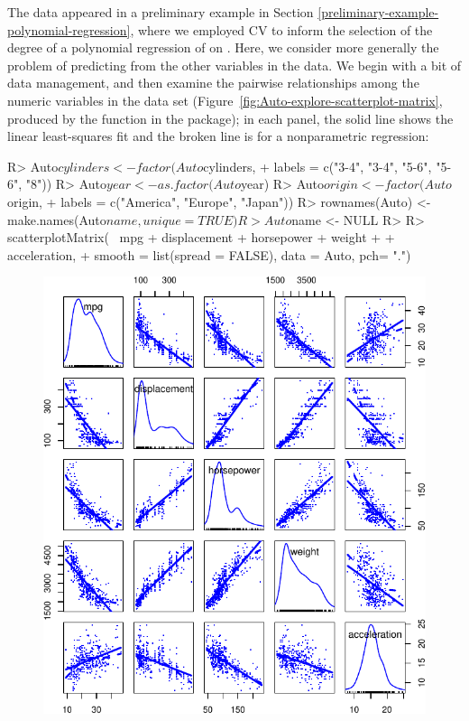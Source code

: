 \documentclass[
]{jss}
\begin{document}
The  data appeared in a preliminary example in Section
\ref{preliminary-example-polynomial-regression}, where we employed CV to
inform the selection of the degree of a polynomial regression of
 on . Here, we consider more generally the
problem of predicting  from the other variables in the
 data. We begin with a bit of data management, and then
examine the pairwise relationships among the numeric variables in the
data set (Figure~\ref{fig:Auto-explore-scatterplot-matrix}, produced by
the  function in the  package); in
each panel, the solid line shows the linear least-squares fit and the
broken line is for a nonparametric regression:

\begin{CodeChunk}
\begin{CodeInput}
R> Auto$cylinders <- factor(Auto$cylinders,
+                          labels = c("3-4", "3-4", "5-6", "5-6", "8"))
R> Auto$year <- as.factor(Auto$year)
R> Auto$origin <- factor(Auto$origin,
+                       labels = c("America", "Europe", "Japan"))
R> rownames(Auto) <- make.names(Auto$name, unique = TRUE)
R> Auto$name <- NULL
R>
R> scatterplotMatrix(~ mpg + displacement + horsepower + weight
+                   + acceleration,
+                   smooth = list(spread = FALSE), data = Auto, pch= ".")
\end{CodeInput}
\begin{figure}

{\centering \includegraphics[width=0.95\linewidth]{jss5535_files/figure-latex/Auto-explore-scatterplot-matrix-1}

}
\end{figure}
\end{CodeChunk}
\end{document}
